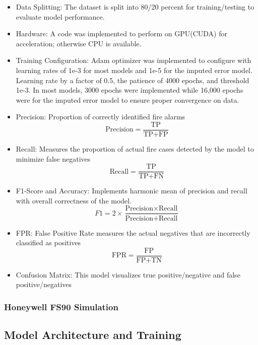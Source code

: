 \documentclass[conference]{IEEEtran}
\begin{document}
\begin{itemize}
\item Data Splitting: The dataset is split into 80/20
percent for training/testing to evaluate model performance. 
\item Hardware: A code was implemented to perform on
GPU(CUDA) for acceleration; otherwise CPU is available. 
\item Training Configuration: Adam optimizer was implemented
to configure with learning rates of 1e-3 for most models and
1e-5 for the imputed error model. Learning rate by a factor
of 0.5, the patience of 4000 epochs, and threshold 1e-3. In
most models, 3000 epochs were implemented while 16,000
epochs were for the imputed error model to ensure proper
convergence on data. 
\item Precision: Proportion of correctly identified fire
alarms 
\begin{equation}
    \text{Precision} = \frac{\text{TP}}{\text{TP} + \text{FP}}
\end{equation}
\item Recall: Measures the proportion of actual fire cases
detected by the model to minimize false negatives
\begin{equation}
    \text{Recall} = \frac{\text{TP}}{\text{TP} + \text{FN}}
\end{equation}
\item F1-Score and Accuracy: Implements harmonic mean of
precision and recall with overall correctness of the model.
\begin{equation}
    F1 = 2 \times \frac{\text{Precision} \times \text{Recall}}{\text{Precision} + \text{Recall}}
\end{equation}
\item FPR: False Positive Rate measures the actual negatives
that are incorrectly classified as positives 
\begin{equation}
    \text{FPR} = \frac{\text{FP}}{\text{FP} + \text{TN}}
\end{equation}
\item Confusion Matrix: This model visualizes true
positive/negative and false positive/negatives
\end{itemize}
\subsubsection{Honeywell FS90 Simulation}



\subsection{Model Architecture and Training}
\end{document}
